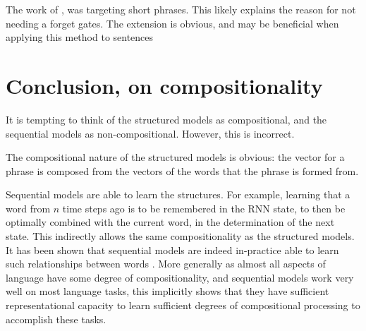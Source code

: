 {\begin{figure}
\begin{adjustbox}{max width=\textwidth}
	\end{adjustbox}
\end{figure}

The work of \textcite{rui2017mvrusemantic}, was targeting short phrases.
This likely explains the reason for not needing a forget gates.
The extension is obvious, and may be beneficial when applying this method to sentences 


\section{Conclusion, on compositionality}
It is tempting to think of the structured models as compositional,
and the sequential models as non-compositional.
However, this is incorrect.

The compositional nature of the structured models is obvious:
the vector for a phrase is composed from the vectors of the words that the phrase is formed from.

Sequential models are able to learn  the structures.
For example, learning that a word from $n$ time steps ago is to be remembered in the RNN state, to then be optimally combined with the current word, in the determination of the next state.
This indirectly allows the same compositionality as the structured models.
It has been shown that sequential models are indeed in-practice able to learn such relationships between words .
More generally as almost all aspects of language have some degree of compositionality, and sequential models work very well on most language tasks, this implicitly shows that they have sufficient representational capacity to learn sufficient degrees of compositional processing to accomplish these tasks.


}
